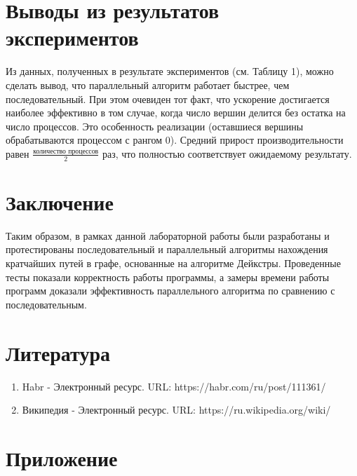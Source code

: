 \documentclass{report}
\begin{document}
\newpage

\section*{Выводы из результатов экспериментов}
\par Из данных, полученных в результате экспериментов (см. Таблицу 1), можно сделать вывод, что параллельный алгоритм работает быстрее, чем последовательный. При этом очевиден тот факт, что ускорение достигается наиболее эффективно в том случае, когда число вершин делится без остатка на число процессов. Это особенность реализации (оставшиеся вершины обрабатываются процессом с рангом 0). Средний прирост производительности равен $\frac{\text{количество  процессов}}{\text{2}}$ раз, что полностью соответствует ожидаемому результату.

\newpage

\section*{Заключение}
\par Таким образом, в рамках данной лабораторной работы были разработаны и протестированы последовательный и параллельный алгоритмы нахождения кратчайших путей в графе, основанные на алгоритме Дейкстры. Проведенные тесты показали корректность работы программы, а замеры времени работы программ доказали эффективность параллельного алгоритма по сравнению с последовательным.

\newpage

\section*{Литература}
\begin{enumerate}
\item Habr - Электронный ресурс. URL: https://habr.com/ru/post/111361/
\item Википедия - Электронный ресурс. URL: https://ru.wikipedia.org/wiki/%
\end{enumerate} 
\newpage

\section*{Приложение}
\end{document}
